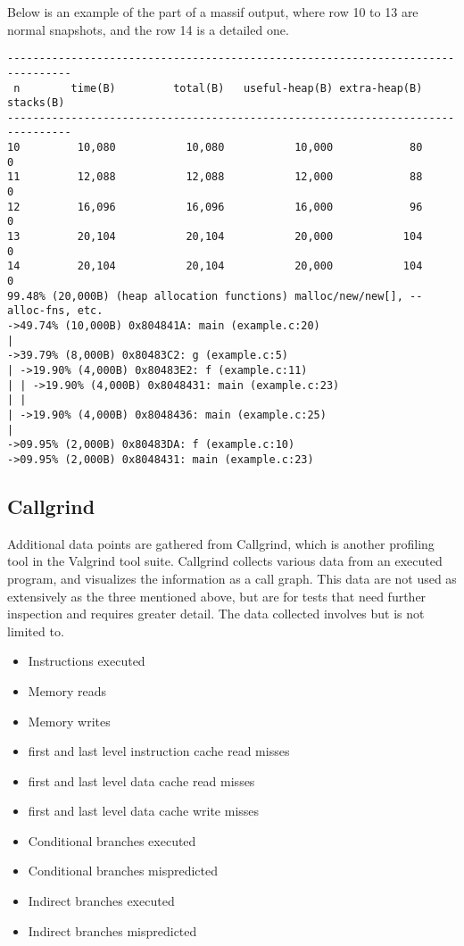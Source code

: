 Below is an example of the part of a massif output, where row 10 to 13 are normal snapshots, and the row 14 is a detailed one.

\begin{lstlisting}[basicstyle=\footnotesize, caption={Massif output example (massif documentation\protect\cite{massif_manual})}, label=lst:massif_output]
--------------------------------------------------------------------------------
 n        time(B)         total(B)   useful-heap(B) extra-heap(B)    stacks(B)
--------------------------------------------------------------------------------
10         10,080           10,080           10,000            80            0
11         12,088           12,088           12,000            88            0
12         16,096           16,096           16,000            96            0
13         20,104           20,104           20,000           104            0
14         20,104           20,104           20,000           104            0
99.48% (20,000B) (heap allocation functions) malloc/new/new[], --alloc-fns, etc.
->49.74% (10,000B) 0x804841A: main (example.c:20)
|
->39.79% (8,000B) 0x80483C2: g (example.c:5)
| ->19.90% (4,000B) 0x80483E2: f (example.c:11)
| | ->19.90% (4,000B) 0x8048431: main (example.c:23)
| |
| ->19.90% (4,000B) 0x8048436: main (example.c:25)
|
->09.95% (2,000B) 0x80483DA: f (example.c:10)
->09.95% (2,000B) 0x8048431: main (example.c:23)
\end{lstlisting}

\subsection{Callgrind}
\label{subsec:measurements_callgrind}
Additional data points are gathered from Callgrind\cite{callgrind_manual}, which is another profiling tool in the Valgrind tool suite.
Callgrind collects various data from an executed program, and visualizes the information as a call graph.
This data are not used as extensively as the three mentioned above,
but are for tests that need further inspection and requires greater detail.
The data collected involves but is not limited to.

\begin{itemize}
    \item Instructions executed
    \item Memory reads
    \item Memory writes
    \item first and last level instruction cache read misses
    \item first and last level data cache read misses
    \item first and last level data cache write misses
    \item Conditional branches executed
    \item Conditional branches mispredicted
    \item Indirect branches executed
    \item Indirect branches mispredicted
\end{itemize}


